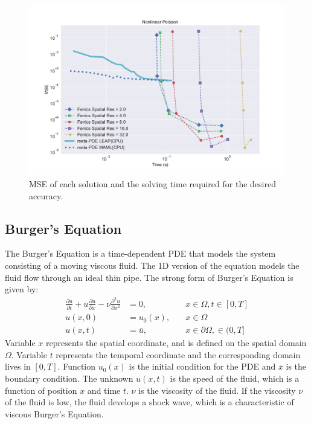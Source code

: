 \begin{figure}[htbp]
  \centering
\includegraphics[width=0.8\linewidth]{figures/poisson.pdf}
\caption{MSE of each solution and the solving time required for the desired accuracy.}%
\label{fig:poisson_summary}%
\end{figure}






\subsection{Burger's Equation}
The Burger's Equation is a time-dependent PDE that models the system consisting of a moving viscous fluid. The 1D version of the equation models the fluid flow through an ideal thin pipe. The strong form of Burger's Equation is given by:
\begin{align}
    \frac{\partial u}{\partial t} + u \frac{\partial u}{\partial x} - \nu \frac{\partial ^2 u}{\partial x^2} &= 0, \quad & x \in \Omega, t \in [0, T] \\
    u(x, 0) &= u_0(x), \quad & x \in \Omega \\
    u(x, t) &= \bar{u}, \quad & x \in \partial \Omega, \in (0, T] 
\end{align}
Variable $x$ represents the spatial coordinate, and is defined on the spatial domain $\Omega$. Variable $t$ represents the temporal coordinate and the corresponding domain lives in $[0, T]$. Function $u_0(x)$ is the initial condition for the PDE and $\bar{x}$ is the boundary condition. The unknown $u(x, t)$ is the speed of the fluid, which is a function of position $x$ and time $t$. $\nu$ is the viscosity of the fluid. If the viscosity $\nu$ of the fluid is low, the fluid develops a shock wave, which is a characteristic of viscous Burger's Equation.

